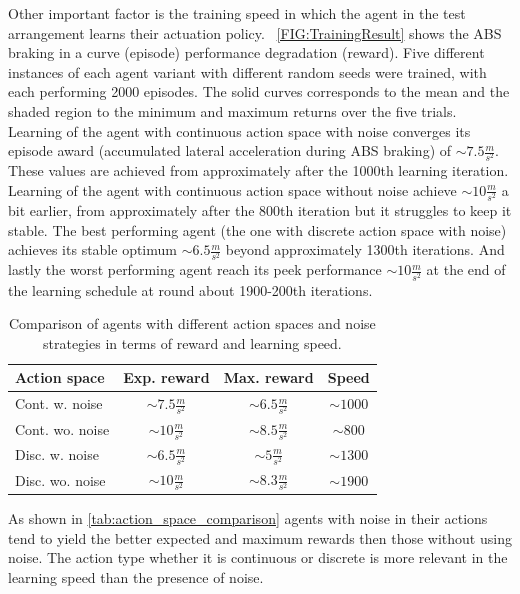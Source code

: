 \documentclass[a4paper, fleqn]{template/cas-dc}
\begin{document}
	Other important factor is the training speed in which the agent in the test arrangement learns their actuation policy. 
	~\autoref{FIG:TrainingResult} shows the ABS braking in a curve (episode) performance degradation (reward). Five different instances of each agent variant with different random seeds were trained, with each performing 2000 episodes. The solid curves corresponds to the mean and the shaded region to the minimum and maximum returns over the five trials.
	Learning of the agent with continuous action space with noise converges its episode award (accumulated lateral acceleration during ABS braking) of $\sim7.5 \frac{m}{s^2}$. These values are achieved from approximately after the 1000th learning iteration. Learning of the agent with continuous action space without noise achieve $\sim10 \frac{m}{s^2}$ a bit earlier, from approximately after the 800th iteration but it struggles to keep it stable. The best performing agent (the one with discrete action space with noise) achieves its stable optimum $\sim6.5 \frac{m}{s^2}$ beyond approximately 1300th iterations. And lastly the worst performing agent reach its peek performance $\sim10 \frac{m}{s^2}$ at the end of the learning schedule at round about 1900-200th iterations.
	
	\begin{table}[hb]		
		\renewcommand{\arraystretch}{1.4} %
		\centering		
		\vspace{1mm}
		\begin{tabular}{l|c|c|c}			
			\toprule
			Action space & Exp. reward & Max. reward & Speed \\
			\midrule
			Cont. w. noise    & $\sim7.5\frac{m}{s^2}$  & $\sim6.5\frac{m}{s^2}$  & $\sim 1000$                \\
			Cont. wo. noise   & $\sim10\frac{m}{s^2}$   & $\sim8.5\frac{m}{s^2}$ & $\sim 800$                 \\
			Disc. w. noise    & $\sim6.5\frac{m}{s^2}$  & $\sim5\frac{m}{s^2}$   & $\sim 1300$                \\
			Disc. wo. noise   & $\sim10\frac{m}{s^2}$   & $\sim8.3\frac{m}{s^2}$ & $\sim 1900$                \\			
			\bottomrule
		\end{tabular}				
		\caption{Comparison of agents with different action spaces and noise strategies in terms of reward and learning speed.}
		\label{tab:action_space_comparison}
	\end{table}
		
	As shown in \autoref{tab:action_space_comparison} agents with noise in their actions tend to yield the better expected and maximum rewards then those without using noise. The action type whether it is continuous or discrete is more relevant in the learning speed than the presence of noise. 		
	
\end{document}
